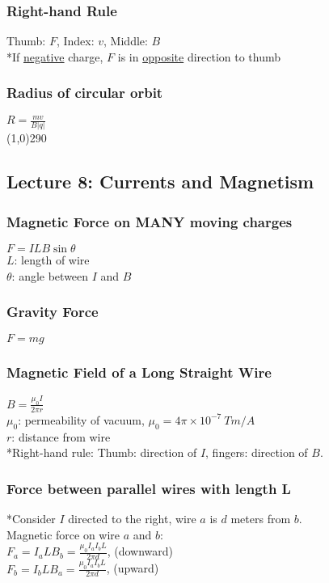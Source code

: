 \documentclass[10 pt]{article}
\begin{document}
\begin{multicols}{2}
\subsubsection*{Right-hand Rule}
Thumb: $F$, Index: $v$, Middle: $B$ \\
*If \underline{negative} charge, $F$ is in \underline{opposite} direction to thumb

\subsubsection*{Radius of circular orbit}
$R = \frac{mv}{B|q|}$ \normalsize
\\
\line(1,0){290}
\subsection*{Lecture 8: Currents and Magnetism}
\subsubsection*{Magnetic Force on MANY moving charges}
$F = ILB\sin{\theta}$ \\
$L$: length of wire \\
$\theta$: angle between $I$ and $B$
\subsubsection*{Gravity Force}
$F = mg$ \normalsize
\subsubsection*{Magnetic Field of a Long Straight Wire}
$B = \frac{\mu_{0} I}{2 \pi r}$ \\
$\mu_{0}$: permeability of vacuum, $\mu_{0} = 4\pi \times 10^{-7}~Tm/A$ \\
$r$: distance from wire \\
*Right-hand rule: Thumb: direction of $I$, fingers: direction of $B$.
\subsubsection*{Force between parallel wires with length L}
*Consider $I$ directed to the right, wire $a$ is $d$ meters from $b$. \\
Magnetic force on wire $a$ and $b$: \\
$F_{a} = I_{a}LB_{b} = \frac{\mu_{0}I_{a}I_{b}L}{2\pi d}$, (downward) \\
$F_{b} = I_{b}LB_{a} = \frac{\mu_{0}I_{a}I_{b}L}{2\pi d}$, (upward)


\end{multicols}
\end{document}
